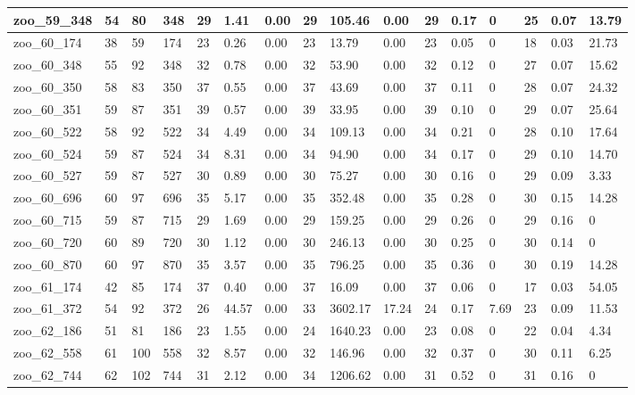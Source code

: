 \begin{landscape}
\begin{longtable}{llllllllllllllll}
zoo\_59\_348 & 54 & 80 & 348 & 29 & 1.41 & 0.00 & 29 & 105.46 & 0.00 & 29 & 0.17 & 0 & 25 & 0.07 & 13.79 \\ \hline 
zoo\_60\_174 & 38 & 59 & 174 & 23 & 0.26 & 0.00 & 23 & 13.79 & 0.00 & 23 & 0.05 & 0 & 18 & 0.03 & 21.73 \\ \hline 
zoo\_60\_348 & 55 & 92 & 348 & 32 & 0.78 & 0.00 & 32 & 53.90 & 0.00 & 32 & 0.12 & 0 & 27 & 0.07 & 15.62 \\ \hline 
zoo\_60\_350 & 58 & 83 & 350 & 37 & 0.55 & 0.00 & 37 & 43.69 & 0.00 & 37 & 0.11 & 0 & 28 & 0.07 & 24.32 \\ \hline 
zoo\_60\_351 & 59 & 87 & 351 & 39 & 0.57 & 0.00 & 39 & 33.95 & 0.00 & 39 & 0.10 & 0 & 29 & 0.07 & 25.64 \\ \hline 
zoo\_60\_522 & 58 & 92 & 522 & 34 & 4.49 & 0.00 & 34 & 109.13 & 0.00 & 34 & 0.21 & 0 & 28 & 0.10 & 17.64 \\ \hline 
zoo\_60\_524 & 59 & 87 & 524 & 34 & 8.31 & 0.00 & 34 & 94.90 & 0.00 & 34 & 0.17 & 0 & 29 & 0.10 & 14.70 \\ \hline 
zoo\_60\_527 & 59 & 87 & 527 & 30 & 0.89 & 0.00 & 30 & 75.27 & 0.00 & 30 & 0.16 & 0 & 29 & 0.09 & 3.33 \\ \hline 
zoo\_60\_696 & 60 & 97 & 696 & 35 & 5.17 & 0.00 & 35 & 352.48 & 0.00 & 35 & 0.28 & 0 & 30 & 0.15 & 14.28 \\ \hline 
zoo\_60\_715 & 59 & 87 & 715 & 29 & 1.69 & 0.00 & 29 & 159.25 & 0.00 & 29 & 0.26 & 0 & 29 & 0.16 & 0 \\ \hline 
zoo\_60\_720 & 60 & 89 & 720 & 30 & 1.12 & 0.00 & 30 & 246.13 & 0.00 & 30 & 0.25 & 0 & 30 & 0.14 & 0 \\ \hline 
zoo\_60\_870 & 60 & 97 & 870 & 35 & 3.57 & 0.00 & 35 & 796.25 & 0.00 & 35 & 0.36 & 0 & 30 & 0.19 & 14.28 \\ \hline 
zoo\_61\_174 & 42 & 85 & 174 & 37 & 0.40 & 0.00 & 37 & 16.09 & 0.00 & 37 & 0.06 & 0 & 17 & 0.03 & 54.05 \\ \hline 
zoo\_61\_372 & 54 & 92 & 372 & 26 & 44.57 & 0.00 & 33 & 3602.17 & 17.24 & 24 & 0.17 & 7.69 & 23 & 0.09 & 11.53 \\ \hline 
zoo\_62\_186 & 51 & 81 & 186 & 23 & 1.55 & 0.00 & 24 & 1640.23 & 0.00 & 23 & 0.08 & 0 & 22 & 0.04 & 4.34 \\ \hline 
zoo\_62\_558 & 61 & 100 & 558 & 32 & 8.57 & 0.00 & 32 & 146.96 & 0.00 & 32 & 0.37 & 0 & 30 & 0.11 & 6.25 \\ \hline 
zoo\_62\_744 & 62 & 102 & 744 & 31 & 2.12 & 0.00 & 34 & 1206.62 & 0.00 & 31 & 0.52 & 0 & 31 & 0.16 & 0 \\ \hline 

\end{longtable}
\end{landscape}
